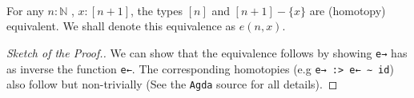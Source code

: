 \documentclass[11pt, a4paper, oneside]{amsart}
\begin{document}
\begin{definition}
\begin{code}[hide]
\AgdaSymbol{\}}\AgdaSpace{}%
\AgdaSymbol{\{}\AgdaSymbol{\}}\AgdaSpace{}%
\AgdaSymbol{=}\AgdaSpace{}%
\<%
\\
%
\>[2]\AgdaSpace{}%
\AgdaSymbol{\{}\AgdaSpace{}%
\AgdaSymbol{\}}\AgdaSpace{}%
\AgdaSymbol{\{}\AgdaSpace{}%
\AgdaSymbol{\}}\AgdaSpace{}%
\AgdaSymbol{\{}\AgdaSpace{}%
\AgdaSymbol{\}}\AgdaSpace{}%
\AgdaSymbol{\{}\AgdaSymbol{\}}\AgdaSpace{}%
\AgdaSymbol{=}\AgdaSpace{}%
\<%
\\
%
\>[2]\AgdaSpace{}%
\AgdaSymbol{\{}\AgdaSpace{}%
\AgdaSymbol{\}}\AgdaSpace{}%
\AgdaSymbol{\{}\AgdaSpace{}%
\AgdaSymbol{\}}\AgdaSpace{}%
\AgdaSymbol{\{}\AgdaSpace{}%
\AgdaSymbol{\}}\AgdaSpace{}%
\AgdaSymbol{\{}\AgdaSymbol{\}}\AgdaSpace{}%
\AgdaSymbol{=}\AgdaSpace{}%
\<%
\\
%
\>[2]\AgdaSpace{}%
\AgdaSymbol{\{}\AgdaSpace{}%
\AgdaSymbol{\}}\AgdaSpace{}%
\AgdaSymbol{\{}\AgdaSpace{}%
\AgdaSymbol{\}}\AgdaSpace{}%
\AgdaSymbol{\{}\AgdaSpace{}%
\AgdaSymbol{\}}\AgdaSpace{}%
\AgdaSymbol{\{}\AgdaSymbol{\}}\AgdaSpace{}%
\AgdaSymbol{=}\AgdaSpace{}%
\<%
\end{code}

\end{definition}

\begin{lemma}\label{equivalence-e}
For any $n : ℕ$ , $x : [ n + 1 ]$,
the types $[n]$ and $[ n + 1] - \{x\}$ are (homotopy) equivalent.
We shall denote this equivalence as $e(n,x)$.
\end{lemma}

\begin{proof}[Sketch of the Proof.]
We can show that the equivalence follows by showing  \texttt{e→} has as inverse
the function \texttt{e←}. The corresponding homotopies (e.g \texttt{e→ :> e← ∼ id})
also follow but non-trivially (See the \texttt{Agda} source for all details).
\end{proof}
\end{document}
